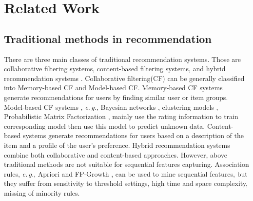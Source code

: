 \documentclass[runningheads]{llncs}
\begin{document}
\section{Related Work}
\subsection{Traditional methods in recommendation}

There are three main classes of traditional recommendation systems. Those are collaborative filtering systems, content-based filtering systems, and hybrid recommendation systems \cite{Adomavicius2013Toward}. Collaborative filtering(CF) can be generally classified into Memory-based \cite{Resnick:1994:GOA:192844.192905,sarwar2001item} CF and Model-based \cite{chien1999bayesian,ungar1998clustering,mnih2008probabilistic} CF. Memory-based CF \cite{Resnick:1994:GOA:192844.192905,sarwar2001item,chien1999bayesian,ungar1998clustering} systems generate recommendations for users by finding similar user or item groups. Model-based CF systems , \emph{e.\,g.}, Bayesian networks \cite{chien1999bayesian}, clustering models \cite{ungar1998clustering}, Probabilistic Matrix Factorization \cite{mnih2008probabilistic}, mainly use the rating information to train corresponding model then use this model to predict unknown data. Content-based systems \cite{balabanovic1997fab} generate recommendations for users based on a description of the item and a profile of the user's preference. Hybrid recommendation systems \cite{burke2002hybrid} combine both collaborative and content-based approaches. However, above traditional methods are not suitable for sequential features capturing. Association rules, \emph{e.\,g.}, Apriori \cite{agrawal1993mining} and FP-Growth \cite{li2008pfp}, can be used to mine sequential features, but they suffer from sensitivity to threshold settings, high time and space complexity, missing of minority rules.
\end{document}

